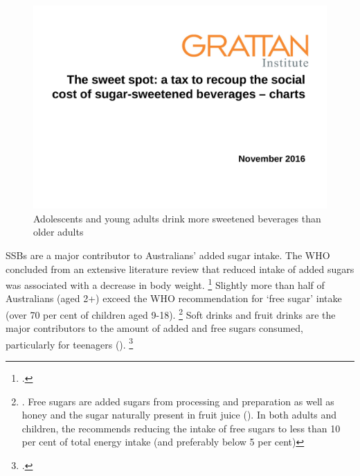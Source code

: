 \documentclass[embargoed]{grattan}
\begin{document}
\begin{figure}
\caption{Adolescents and young adults drink more sweetened beverages than older adults}\label{fig:adolescents-drink-more-sweet-beverages-than-adults}

\includegraphics[page=9]{atlas/ObesityCharts}


\end{figure}


SSBs are a major contributor to Australians' added sugar intake.
The WHO concluded from an extensive literature review that reduced intake of added sugars was associated with a decrease in body weight.%
\footcite{Organisation2015Sugarsintakeadults} Slightly more than half of Australians (aged 2+) exceed the WHO recommendation for `free sugar' intake (over 70 per cent of children aged 9-18).%
\footnote{\textcite{Lei2016Dietaryintakefood}.
Free sugars are added sugars from processing and preparation as well as honey and the sugar naturally present in fruit juice (\textcite[][Table~3.1]{ABS20164364055011AustralianHealth}).
In both adults and children, the \textcite{Organisation2015Sugarsintakeadults} recommends reducing the intake of free sugars to less than 10 per cent of total energy intake (and preferably below 5 per cent)} Soft drinks and fruit drinks are the major contributors to the amount of added and free sugars consumed, particularly for teenagers ().%
\footcite{ABS20164364055011AustralianHealth}
\end{document}
